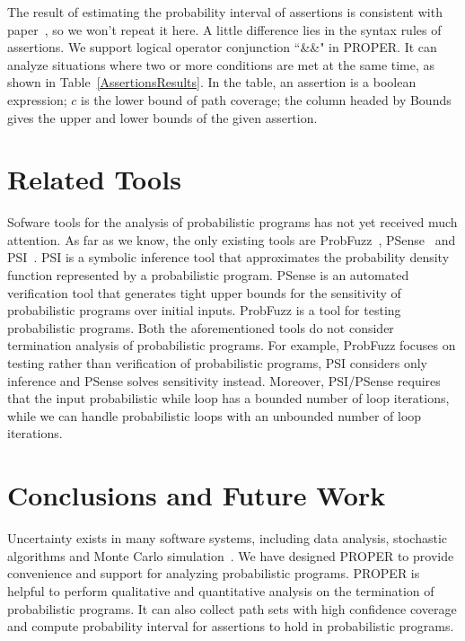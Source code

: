 \documentclass[sigconf,review, anonymous]{acmart}
\begin{document}
The result of estimating the probability interval of assertions is consistent with paper~\cite{Sankaranarayanan2013Static}, so we won't repeat it here. A little difference lies in the syntax rules of assertions. We support logical operator conjunction ``\&\&" in PROPER. It can analyze situations where two or more conditions are met at the same time, as shown in Table~\ref{AssertionsResults}. In the table, an assertion is a boolean expression; $c$ is the lower bound of path coverage; the column headed by Bounds gives the upper and lower bounds of the given assertion.%

\section{Related Tools}
Sofware tools for the analysis of probabilistic programs has not yet received much attention. 
As far as we know, the only existing tools are ProbFuzz~\cite{DBLP:conf/sigsoft/DuttaLHM18}, PSense~\cite{DBLP:conf/atva/HuangWM18} and PSI~\cite{DBLP:conf/cav/GehrMV16}.
PSI is a symbolic inference tool that approximates the probability density function represented by a probabilistic program. 
PSense is an automated verification tool that generates tight upper bounds for the sensitivity of probabilistic programs over initial inputs.
ProbFuzz is a tool for testing probabilistic programs. 
Both the aforementioned tools do not consider termination analysis of probabilistic programs. 
For example, ProbFuzz focuses on testing rather than verification of probabilistic programs, 
PSI considers only inference and PSense solves sensitivity instead. 
Moreover, PSI/PSense requires that the input probabilistic while loop has a bounded number of loop iterations, while we can handle probabilistic loops with an unbounded number of loop iterations.

\section{Conclusions and Future Work}
Uncertainty exists in many software systems, including data analysis, stochastic algorithms and Monte Carlo simulation~\cite{HASTINGS1970Monte}. We have designed PROPER  to provide convenience and support for analyzing probabilistic programs.
PROPER is helpful to perform qualitative and quantitative analysis on the termination of probabilistic programs. It can also collect path sets with high confidence coverage and compute  probability interval for assertions to hold in probabilistic programs.
\end{document}
